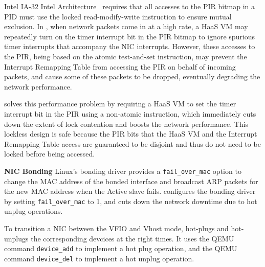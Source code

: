 Intel IA-32 Intel Architecture~\cite{sdm:2018}  requires that all accesses to the PIR bitmap in a PID
must use the locked read-modify-write instruction to ensure mutual exclusion. 
In \sna, when network packets come in at a high rate, a HaaS VM may repeatedly turn 
on the timer interrupt bit in the PIR bitmap to ignore  spurious timer interrupts that 
accompany the NIC interrupts. However, these accesses to the PIR, being based on the
atomic test-and-set instruction, may prevent the Interrupt Remapping Table from 
accessing the PIR on behalf of incoming packets, and cause some of these 
packets to be dropped, eventually degrading the network performance.
 
\na solves this performance problem by requiring a HaaS VM to set the timer interrupt bit
in the PIR using a non-atomic instruction, which immediately cuts down the extent of lock contention
and boosts the network performance. This lockless design is safe because the PIR bits 
that the HaaS VM and the Interrupt Remapping Table access are guaranteed to be 
disjoint and thus do not need to be locked before being accessed.


{\bf NIC Bonding}
Linux's bonding driver provides a \texttt{fail\_over\_mac} option to change 
the MAC address of the bonded interface and broadcast ARP packets for the new MAC address 
when the Active slave fails. \na configures the bonding driver by setting   
\texttt{fail\_over\_mac} to 1, and cuts down the
network downtime due to hot unplug operations.

To transition a NIC between the VFIO and Vhost mode, \na hot-plugs and hot-unplugs the corresponding devcices at the right times.  It uses the QEMU command \texttt{device\_add} to implement a hot plug operation, and the QEMU command \texttt{device\_del} to implement a hot unplug operation. 







